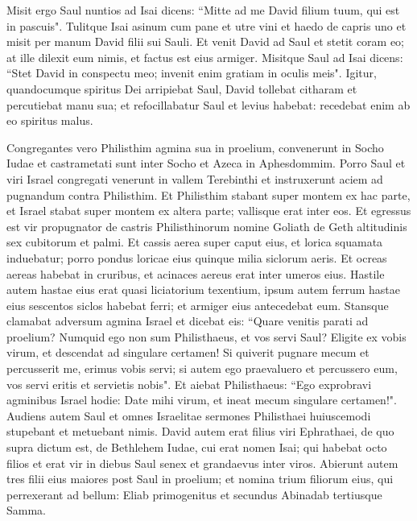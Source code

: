 \begin{biblechapter}
\verse Misit ergo Saul nuntios ad Isai dicens: “Mitte ad me David filium tuum, qui est in pascuis". 
\verse Tulitque Isai asinum cum pane et utre vini et haedo de capris uno et misit per manum David filii sui Sauli. 
\verse Et venit David ad Saul et stetit coram eo; at ille dilexit eum nimis, et factus est eius armiger. 
\verse Misitque Saul ad Isai dicens: “Stet David in conspectu meo; invenit enim gratiam in oculis meis".  
\verse Igitur, quandocumque spiritus Dei arripiebat Saul, David tollebat citharam et percutiebat manu sua; et refocillabatur Saul et levius habebat: recedebat enim ab eo spiritus malus. 
\end{biblechapter}

\begin{biblechapter}  
\verse Congregantes vero Philisthim agmina sua in proelium, convenerunt in Socho Iudae et castrametati sunt inter Socho et Azeca in Aphesdommim. 
\verse Porro Saul et viri Israel congregati venerunt in vallem Terebinthi et instruxerunt aciem ad pugnandum contra Philisthim. 
\verse Et Philisthim stabant super montem ex hac parte, et Israel stabat super montem ex altera parte; vallisque erat inter eos. 
\verse Et egressus est vir propugnator de castris Philisthinorum nomine Goliath de Geth altitudinis sex cubitorum et palmi. 
\verse Et cassis aerea super caput eius, et lorica squamata induebatur; porro pondus loricae eius quinque milia siclorum aeris. 
\verse Et ocreas aereas habebat in cruribus, et acinaces aereus erat inter umeros eius. 
\verse Hastile autem hastae eius erat quasi liciatorium texentium, ipsum autem ferrum hastae eius sescentos siclos habebat ferri; et armiger eius antecedebat eum. 
\verse Stansque clamabat adversum agmina Israel et dicebat eis: “Quare venitis parati ad proelium? Numquid ego non sum Philisthaeus, et vos servi Saul? Eligite ex vobis virum, et descendat ad singulare certamen! 
\verse Si quiverit pugnare mecum et percusserit me, erimus vobis servi; si autem ego praevaluero et percussero eum, vos servi eritis et servietis nobis". 
\verse Et aiebat Philisthaeus: “Ego exprobravi agminibus Israel hodie: Date mihi virum, et ineat mecum singulare certamen!". 
\verse Audiens autem Saul et omnes Israelitae sermones Philisthaei huiuscemodi stupebant et metuebant nimis. 
\verse David autem erat filius viri Ephrathaei, de quo supra dictum est, de Bethlehem Iudae, cui erat nomen Isai; qui habebat octo filios et erat vir in diebus Saul senex et grandaevus inter viros. 
\verse Abierunt autem tres filii eius maiores post Saul in proelium; et nomina trium filiorum eius, qui perrexerant ad bellum: Eliab primogenitus et secundus Abinadab tertiusque Samma.  

\end{biblechapter}

